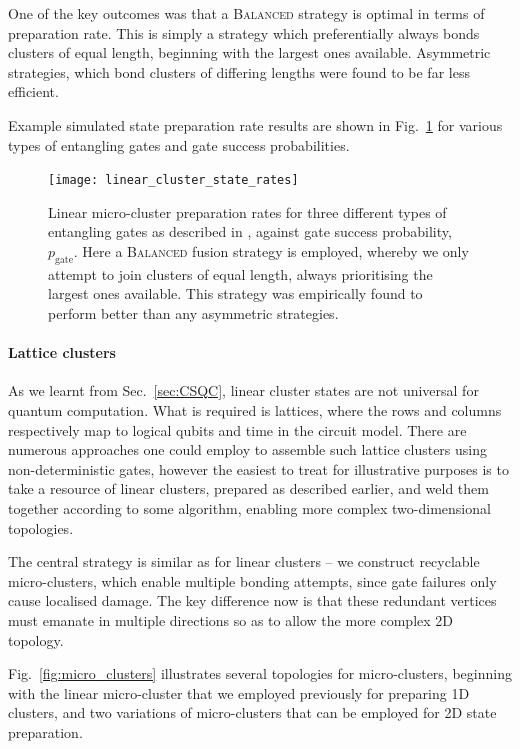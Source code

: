 One of the key outcomes was that a \textsc{Balanced} strategy is optimal in terms of preparation rate. This is simply a strategy which preferentially always bonds clusters of equal length, beginning with the largest ones available. Asymmetric strategies, which bond clusters of differing lengths were found to be far less efficient.

Example simulated state preparation rate results are shown in Fig.~\ref{fig:linear_cluster_state_r} for various types of entangling gates and gate success probabilities.

\begin{figure}[!htb]
\texttt{[image: linear\_cluster\_state\_rates]}
\caption{Linear micro-cluster preparation rates for three different types of entangling gates as described in \cite{bib:RohdeBarrett07}, against gate success probability, $p_\text{gate}$. Here a \textsc{Balanced} fusion strategy is employed, whereby we only attempt to join clusters of equal length, always prioritising the largest ones available. This strategy was empirically found to perform better than any asymmetric strategies.}\label{fig:linear_cluster_state_r}
\end{figure}

%
%

\paragraph{Lattice clusters}

As we learnt from Sec.~\ref{sec:CSQC}, linear cluster states are not universal for quantum computation. What is required is lattices, where the rows and columns respectively map to logical qubits and time in the circuit model. There are numerous approaches one could employ to assemble such lattice clusters using non-deterministic gates, however the easiest to treat for illustrative purposes is to take a resource of linear clusters, prepared as described earlier, and weld them together according to some algorithm, enabling more complex two-dimensional topologies.

The central strategy is similar as for linear clusters -- we construct recyclable micro-clusters, which enable multiple bonding attempts, since gate failures only cause localised damage. The key difference now is that these redundant vertices must emanate in multiple directions so as to allow the more complex 2D topology.

Fig.~\ref{fig:micro_clusters} illustrates several topologies for micro-clusters, beginning with the linear micro-cluster that we employed previously for preparing 1D clusters, and two variations of micro-clusters that can be employed for 2D state preparation.

